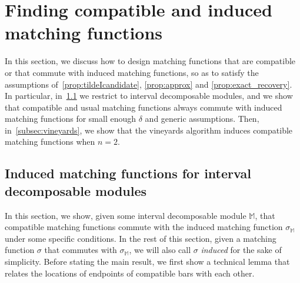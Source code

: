 \documentclass{article}
\newcommand{\matching}{\sigma}
\newcommand{\Mbb}{\mathbb{M}}
\newcommand{\M}{{\mathbb M}}
\newcommand{\rebuttal}[1]{{ #1}}
\begin{document}
\section{\rebuttal{Finding compatible and induced matching functions}}
\label{sec:matching_mma}


\rebuttal{In this section, we discuss how to design matching functions that are compatible or that commute with induced matching functions,
	so as to satisfy the assumptions of~\cref{prop:tildeIcandidate}, \cref{prop:approx} and \cref{prop:exact_recovery}. In particular, in~\cref{app:compat_exact} we restrict to interval decomposable modules, and we show that compatible and usual matching functions always commute with induced matching functions for small enough $\delta$ and generic assumptions. Then, in~\cref{subsec:vineyards}, we show that the vineyards algorithm induces compatible matching functions when $n=2$.
	}













\subsection{Induced matching functions for interval decomposable modules}\label{app:compat_exact}

In this section, we show, given some interval decomposable module $\Mbb$, that compatible matching functions commute with the induced matching function $\matching_{\M}$  under some specific conditions. In the rest of this section, given a matching function $\matching$ that commutes with $\matching_\M$, we will also call $\matching$ \rebuttal{{\em induced}} for the sake of simplicity. Before stating the main result, we first show a technical lemma that relates the locations of endpoints of compatible bars with each other. \\
\end{document}
